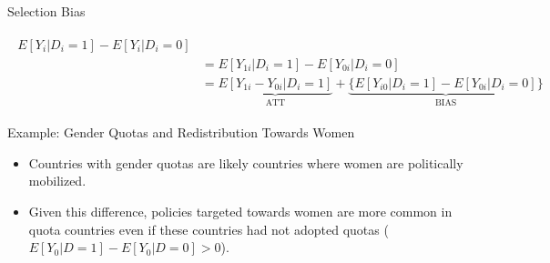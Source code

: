\documentclass{beamer}
\numberwithin{equation}{section}
\begin{document}
\begin{frame}{Selection Bias}

\small
\begin{scriptsize}
\begin{align}
\begin{split}
E[Y_i|D_i=1]-E[Y_i|D_i=0] \\
&=E[Y_{1i} | D_i=1]-E[Y_{0i} | D_i=0]\\
                 &=\underbrace{E[Y_{1i} - Y_{0i} | D_i=1]}_{\mbox{ATT}}
                 +\underbrace{\{ E[Y_{i0} | D_i=1]- E[Y_{0i} | D_i=0]\}}_{\mbox{BIAS}}\nonumber
\end{split}
\end{align}
\end{scriptsize}

Example: Gender Quotas and Redistribution Towards Women

\begin{itemize}
\itemsep1pt\parskip0pt
\item
  Countries with gender quotas are likely countries where women are
  politically mobilized.\medskip
\item
  Given this difference, policies targeted towards women are more common in
  quota countries even if these countries had not adopted quotas
  ($E[Y_0 | D=1]-E[Y_0 | D=0]>0$).
\end{itemize}

\end{frame}
\end{document}
